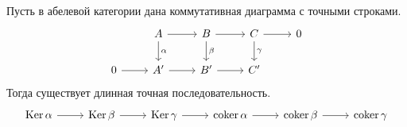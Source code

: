 \documentclass[../main.tex]{subfiles}
\begin{document}
\begin{to_suj}\label{B:snake_lemma}
Пусть в абелевой категории дана коммутативная диаграмма с точными строками.
\begin{equation*}
\begin{tikzcd}
	& A & B & C & 0 \\
	0 & {A'} & {B'} & {C'}
	\arrow[from=1-2, to=1-3]
	\arrow[from=1-3, to=1-4]
	\arrow[from=1-4, to=1-5]
	\arrow[from=2-1, to=2-2]
	\arrow[from=2-2, to=2-3]
	\arrow[from=2-3, to=2-4]
	\arrow["\alpha", from=1-2, to=2-2]
	\arrow["\beta", from=1-3, to=2-3]
	\arrow["\gamma", from=1-4, to=2-4]
\end{tikzcd}
\end{equation*}
Тогда существует длинная точная последовательность.
\begin{equation*}
    \begin{tikzcd}
	\Ker\alpha & \Ker\beta & \Ker\gamma & \coker\alpha & \coker\beta & \coker\gamma
	\arrow[from=1-1, to=1-2]
	\arrow[from=1-2, to=1-3]
	\arrow[from=1-3, to=1-4]
	\arrow[from=1-4, to=1-5]
	\arrow[from=1-5, to=1-6]
\end{tikzcd}
\end{equation*}
\end{to_suj}
\end{document}
